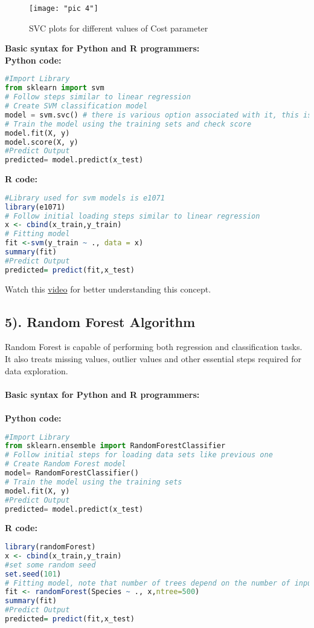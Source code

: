 \documentclass[Proceedings]{ascelike}
\begin{document}
\begin{figure}[!ht]
	\centering
	\texttt{[image: "pic 4"]}
	\caption{SVC plots for different values of Cost parameter}
	\label{fig:pic-4}
\end{figure}
\newpage
\textbf{Basic syntax for Python and R programmers:}\\
\textbf{Python code:}
\begin{lstlisting}[language=Python]
#Import Library
from sklearn import svm
# Follow steps similar to linear regression
# Create SVM classification model
model = svm.svc() # there is various option associated with it, this is simple for classification. 
# Train the model using the training sets and check score
model.fit(X, y)
model.score(X, y)
#Predict Output
predicted= model.predict(x_test)
\end{lstlisting}
\textbf{R code:}
\begin{lstlisting}[language=R]
#Library used for svm models is e1071
library(e1071)
# Follow initial loading steps similar to linear regression
x <- cbind(x_train,y_train)
# Fitting model
fit <-svm(y_train ~ ., data = x)
summary(fit)
#Predict Output 
predicted= predict(fit,x_test)
\end{lstlisting}
Watch this \href{https://www.youtube.com/watch?v=pS5gXENd3a4}{video} for better understanding this concept.

\subsection{5). Random Forest Algorithm}

Random Forest is capable of performing both regression and classification tasks. It also treats missing values, outlier values and other essential steps required for data exploration.\\\\
\textbf{Basic syntax for Python and R programmers:}\\
\\\textbf{Python code:}
\begin{lstlisting}[language=Python]
#Import Library
from sklearn.ensemble import RandomForestClassifier
# Follow initial steps for loading data sets like previous one
# Create Random Forest model
model= RandomForestClassifier()
# Train the model using the training sets 
model.fit(X, y)
#Predict Output
predicted= model.predict(x_test)
\end{lstlisting}
\textbf{R code:}
\begin{lstlisting}[language=R]
library(randomForest)
x <- cbind(x_train,y_train)
#set some random seed
set.seed(101)
# Fitting model, note that number of trees depend on the number of inputs and also size of data, here for instance assumed 500 trees
fit <- randomForest(Species ~ ., x,ntree=500)
summary(fit)
#Predict Output 
predicted= predict(fit,x_test)
\end{lstlisting}
\end{document}
